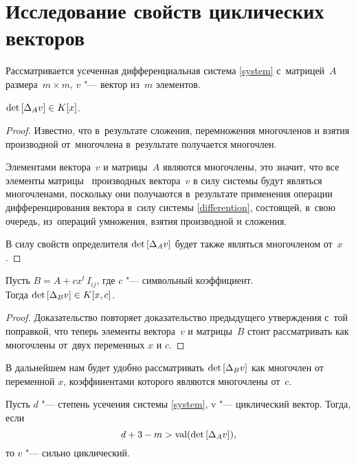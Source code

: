 \section{Исследование свойств циклических векторов}

Рассматривается усеченная дифференциальная система \eqref{system} с~матрицей~$A$ размера~$m \times m$,
$v$ "--- вектор из~$m$ элементов.


\begin{proposition}
    $\mathop{\rm det}\text{$ [\Delta_A v] $} \in K[x]$.
\end{proposition}

\begin{proof}
    Известно, что в~результате сложения, перемножения многочленов и взятия производной от~многочлена
    в~результате получается многочлен.
    
    Элементами вектора~$v$ и матрицы~$A$ являются многочлены,
    это значит, что все элементы матрицы \diffMatrix\ производных вектора~$v$ в силу системы
    будут являться многочленами, поскольку они получаются в~результате применения
    операции дифференцирования вектора в~силу системы \eqref{differention},
    состоящей, в~свою очередь, из~операций умножения, взятия производной и сложения.
    
    В силу свойств определителя $\mathop{\rm det}\text{$ [\Delta_A v] $}$ будет также являться многочленом от~$x$.
\end{proof}


\begin{proposition}
    Пусть $B = A + cx^t \, I_{ij}$, где $c$ "--- символьный коэффициент.\\
    Тогда $\mathop{\rm det}\text{$ [\Delta_B v] $} \in K[x, c]$.
\end{proposition}

\begin{proof}
    Доказательство повторяет доказательство предыдущего утверждения с~той поправкой,
    что теперь элементы вектора~$v$ и матрицы~$B$ стоит рассматривать как многочлены от~двух переменных $x$ и $c$.
\end{proof}

В дальнейшем нам будет удобно рассматривать $\mathop{\rm det}\text{$ [\Delta_B v] $}$
как многочлен от переменной $x$, коэффииентами которого являются многочлены от~$c$.


\begin{proposition}
Пусть $d$ "--- степень усечения системы \eqref{system}, v "--- циклический вектор. Тогда, если
\begin{equation}
	d + 3 - m > \mathop{\rm val}(\mathop{\rm det}\text{$ [\Delta_A v] $}),
	\label{d3m}
\end{equation}
то $v$ "--- сильно циклический.

\end{proposition}

